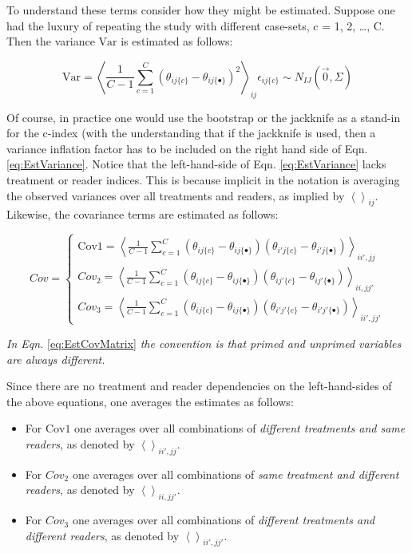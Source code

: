 \documentclass[
]{book}
\providecommand{\tightlist}{%
  \setlength{\itemsep}{0pt}\setlength{\parskip}{0pt}}
\begin{document}
To understand these terms consider how they might be estimated. Suppose one had the luxury of repeating the study with different case-sets, c = 1, 2, \ldots, C. Then the variance \(\text{Var}\) is estimated as follows:

\begin{equation}
\text{Var}=
\left \langle \frac{1}{C-1}\sum_{c=1}^{C} (\theta_{ij\{c\}}-\theta_{ij\{\bullet\}})^2 \right \rangle_{ij}
\epsilon_{ij\{c\}} \sim N_{IJ}(\vec{0},\Sigma)
\label{eq:EstVariance}
\end{equation}

Of course, in practice one would use the bootstrap or the jackknife as a stand-in for the c-index (with the understanding that if the jackknife is used, then a variance inflation factor has to be included on the right hand side of Eqn. \eqref{eq:EstVariance}. Notice that the left-hand-side of Eqn. \eqref{eq:EstVariance} lacks treatment or reader indices. This is because implicit in the notation is averaging the observed variances over all treatments and readers, as implied by \(\left \langle \right \rangle _{ij}\). Likewise, the covariance terms are estimated as follows:

\begin{equation}
Cov=\left\{\begin{matrix}
\text{Cov1}=\left \langle \frac{1}{C-1}\sum_{c=1}^{C} (\theta_{ij\{c\}}-\theta_{ij\{\bullet\}}) (\theta_{i'j\{c\}}-\theta_{i'j\{\bullet\}}) \right \rangle_{ii',jj}\\ 
Cov_2=\left \langle \frac{1}{C-1}\sum_{c=1}^{C} (\theta_{ij\{c\}}-\theta_{ij\{\bullet\}}) (\theta_{ij'\{c\}}-\theta_{ij'\{\bullet\}}) \right \rangle_{ii,jj'}\\ 
Cov_3=\left \langle \frac{1}{C-1}\sum_{c=1}^{C} (\theta_{ij\{c\}}-\theta_{ij\{\bullet\}}) (\theta_{i'j'\{c\}}-\theta_{i'j'\{\bullet\}}) \right \rangle_{ii',jj'}
\end{matrix}\right.
\label{eq:EstCovMatrix}
\end{equation}

\emph{In Eqn.} \eqref{eq:EstCovMatrix} \emph{the convention is that primed and unprimed variables are always different.}

Since there are no treatment and reader dependencies on the left-hand-sides of the above equations, one averages the estimates as follows:

\begin{itemize}
\tightlist
\item
  For \(\text{Cov1}\) one averages over all combinations of \emph{different treatments and same readers}, as denoted by \(\left \langle \right \rangle_{ii',jj}\).
\item
  For \(Cov_2\) one averages over all combinations of \emph{same treatment and different readers}, as denoted by \(\left \langle \right \rangle_{ii,jj'}\).
\item
  For \(Cov_3\) one averages over all combinations of \emph{different treatments and different readers}, as denoted by \(\left \langle \right \rangle_{ii',jj'}\).
\end{itemize}
\end{document}
